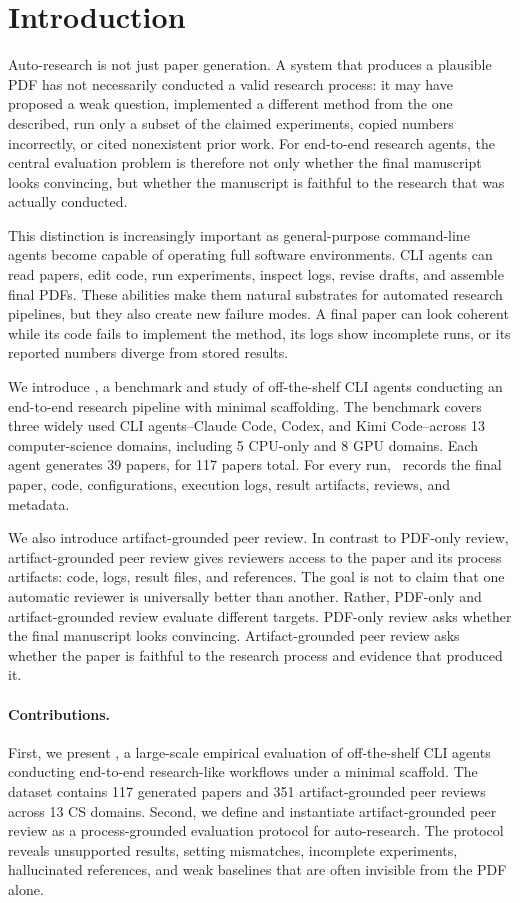 \section{Introduction}

Auto-research is not just paper generation. A system that produces a plausible PDF has not necessarily conducted a valid research process: it may have proposed a weak question, implemented a different method from the one described, run only a subset of the claimed experiments, copied numbers incorrectly, or cited nonexistent prior work. For end-to-end research agents, the central evaluation problem is therefore not only whether the final manuscript looks convincing, but whether the manuscript is faithful to the research that was actually conducted.

This distinction is increasingly important as general-purpose command-line agents become capable of operating full software environments. CLI agents can read papers, edit code, run experiments, inspect logs, revise drafts, and assemble final PDFs. These abilities make them natural substrates for automated research pipelines, but they also create new failure modes. A final paper can look coherent while its code fails to implement the method, its logs show incomplete runs, or its reported numbers diverge from stored results.

We introduce \ra, a benchmark and study of off-the-shelf CLI agents conducting an end-to-end research pipeline with minimal scaffolding. The benchmark covers three widely used CLI agents--Claude Code, Codex, and Kimi Code--across 13 computer-science domains, including 5 CPU-only and 8 GPU domains. Each agent generates 39 papers, for 117 papers total. For every run, \ra\ records the final paper, code, configurations, execution logs, result artifacts, reviews, and metadata.

We also introduce artifact-grounded peer review. In contrast to PDF-only review, artifact-grounded peer review gives reviewers access to the paper and its process artifacts: code, logs, result files, and references. The goal is not to claim that one automatic reviewer is universally better than another. Rather, PDF-only and artifact-grounded review evaluate different targets. PDF-only review asks whether the final manuscript looks convincing. Artifact-grounded peer review asks whether the paper is faithful to the research process and evidence that produced it.

\paragraph{Contributions.}
First, we present \ra, a large-scale empirical evaluation of off-the-shelf CLI agents conducting end-to-end research-like workflows under a minimal scaffold. The dataset contains 117 generated papers and 351 artifact-grounded peer reviews across 13 CS domains. Second, we define and instantiate artifact-grounded peer review as a process-grounded evaluation protocol for auto-research. The protocol reveals unsupported results, setting mismatches, incomplete experiments, hallucinated references, and weak baselines that are often invisible from the PDF alone.

